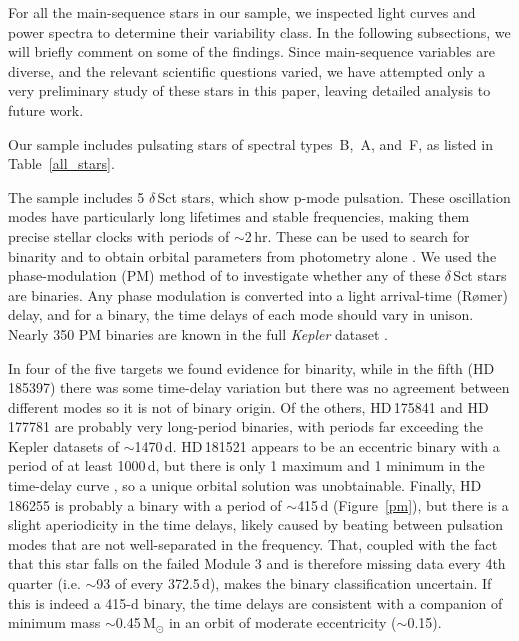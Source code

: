 \documentclass[a4paper,fleqn,usenatbib]{mnras}
\begin{document}
For all the main-sequence stars in our sample, we inspected light curves and power spectra to determine their variability class. In the following subsections, we will briefly comment on some of the findings. Since main-sequence variables are diverse, and the relevant scientific questions varied, we have attempted only a very preliminary study of these stars in this paper, leaving detailed analysis to future work.

Our sample includes pulsating stars of spectral types~B,~A, and~F, as listed in Table~\ref{all_stars}. 

The sample includes 5 $\delta$\,Sct stars, which show p-mode pulsation. These oscillation modes have particularly long lifetimes and stable frequencies, making them precise stellar clocks with periods of $\sim$2\,hr. These can be used to search for binarity and to obtain orbital parameters from photometry alone \citep{shibahashi&kurtz2012}. We used the phase-modulation (PM) method of \citet{murphyetal2014} to investigate whether any of these $\delta$\,Sct stars are binaries. Any phase modulation is converted into a light arrival-time (R\o mer) delay, and for a binary, the time delays of each mode should vary in unison. Nearly 350 PM binaries are known in the full \textit{Kepler} dataset \citep{murphyetal2018}.

In four of the five targets we found evidence for binarity, while in the fifth (HD\,185397) there was some time-delay variation but there was no agreement between different modes so it is not of binary origin. Of the others, HD\,175841 and HD\,177781 are probably very long-period binaries, with periods far exceeding the Kepler datasets of $\sim$1470\,d. HD\,181521 appears to be an eccentric binary with a period of at least 1000\,d, but there is only 1 maximum and 1 minimum in the time-delay curve \citep[cf.][]{murphy&shibahashi2015}, so a unique orbital solution was unobtainable. Finally, HD\,186255 is probably a binary with a period of $\sim$415\,d (Figure~\ref{pm}), but there is a slight aperiodicity in the time delays, likely caused by beating between pulsation modes that are not well-separated in the frequency. That, coupled with the fact that this star falls on the failed Module 3 and is therefore missing data every 4th quarter (i.e. $\sim$93 of every 372.5\,d), makes the binary classification uncertain. If this is indeed a 415-d binary, the time delays are consistent with a companion of minimum mass $\sim$0.45\,M$_{\odot}$ in an orbit of moderate eccentricity ($\sim$0.15).
\end{document}
